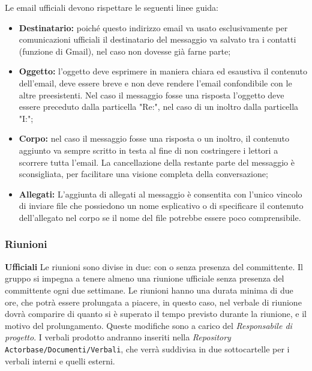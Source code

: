 \documentclass[a4paper]{article}
\begin{document}
	Le email ufficiali devono rispettare le seguenti linee guida:
	\begin{itemize}
		\item \textbf{Destinatario:} poiché questo indirizzo email va usato esclusivamente per comunicazioni ufficiali il destinatario
		del messaggio va salvato tra i contatti (funzione di Gmail), nel caso non dovesse già farne parte;
		\item \textbf{Oggetto:} l'oggetto deve esprimere in maniera chiara ed esaustiva il contenuto dell'email, deve essere breve
		 e non deve rendere l'email confondibile con le altre preesistenti.
		 Nel caso il messaggio fosse una risposta l'oggetto deve essere preceduto dalla particella "Re:", nel caso di un inoltro dalla
		 particella "I:";
		\item \textbf{Corpo:} nel caso il messaggio fosse una risposta o un inoltro, il contenuto aggiunto va sempre scritto in testa al
		fine di non costringere i lettori a scorrere tutta l'email. La cancellazione della restante parte del messaggio è sconsigliata, per
		facilitare una visione completa della conversazione;
		\item \textbf{Allegati:} L'aggiunta di allegati al messaggio è consentita con l'unico vincolo di inviare file che possiedono un nome
		esplicativo o di specificare il contenuto dell'allegato nel corpo se il nome del file potrebbe essere poco comprensibile.
	\end{itemize}
	\subsubsection{Riunioni}
		\textbf{Ufficiali}
		Le riunioni sono divise in due: con o senza presenza del committente. Il gruppo si impegna a tenere almeno una riunione
		ufficiale senza presenza del committente ogni due settimane. Le riunioni hanno una durata minima di due ore, che potrà
		essere prolungata a piacere, in questo caso, nel verbale di riunione dovrà comparire di quanto si è superato il tempo
		previsto durante la riunione, e il motivo del prolungamento. Queste modifiche sono a carico del \emph{Responsabile di progetto}.
		I verbali prodotto andranno inseriti nella \emph{Repository} \verb|Actorbase/Documenti/Verbali|, che verrà suddivisa in due
		sottocartelle per i verbali interni e quelli esterni.
\end{document}

